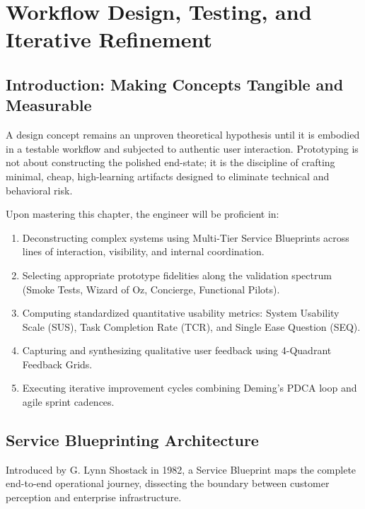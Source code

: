 \chapter{Workflow Design, Testing, and Iterative Refinement}
\label{chap:workflow-testing}

\section{Introduction: Making Concepts Tangible and Measurable}
A design concept remains an unproven theoretical hypothesis until it is embodied in a testable workflow and subjected to authentic user interaction. Prototyping is not about constructing the polished end-state; it is the discipline of crafting minimal, cheap, high-learning artifacts designed to eliminate technical and behavioral risk.

\begin{important}
Upon mastering this chapter, the engineer will be proficient in:
\begin{enumerate}[leftmargin=1.5em]
    \item Deconstructing complex systems using Multi-Tier Service Blueprints across lines of interaction, visibility, and internal coordination.
    \item Selecting appropriate prototype fidelities along the validation spectrum (Smoke Tests, Wizard of Oz, Concierge, Functional Pilots).
    \item Computing standardized quantitative usability metrics: System Usability Scale (SUS), Task Completion Rate (TCR), and Single Ease Question (SEQ).
    \item Capturing and synthesizing qualitative user feedback using 4-Quadrant Feedback Grids.
    \item Executing iterative improvement cycles combining Deming's PDCA loop and agile sprint cadences.
\end{enumerate}
\end{important}

\section{Service Blueprinting Architecture}
Introduced by G. Lynn Shostack in 1982, a Service Blueprint maps the complete end-to-end operational journey, dissecting the boundary between customer perception and enterprise infrastructure.

